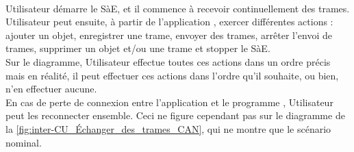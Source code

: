 \\
Utilisateur démarre le SàE, et il commence à recevoir continuellement des trames. Utilisateur peut ensuite, à partir de l'application {\nomApplication}, exercer différentes actions : ajouter un objet, enregistrer une trame, envoyer des trames, arrêter l'envoi de trames, supprimer un objet et/ou une trame et stopper le SàE. \\ 
Sur le diagramme, Utilisateur effectue toutes ces actions dans un ordre précis mais en réalité, il peut effectuer ces actions dans l'ordre qu'il souhaite, ou bien, n'en effectuer aucune. \\
En cas de perte de connexion entre l'application {\nomApplication} et le programme {\nomLogiciel}, Utilisateur peut les reconnecter ensemble. Ceci ne figure cependant pas sur le diagramme de la \autoref{fig:inter-CU_Échanger_des_trames_CAN}, qui ne montre que le scénario nominal.\\